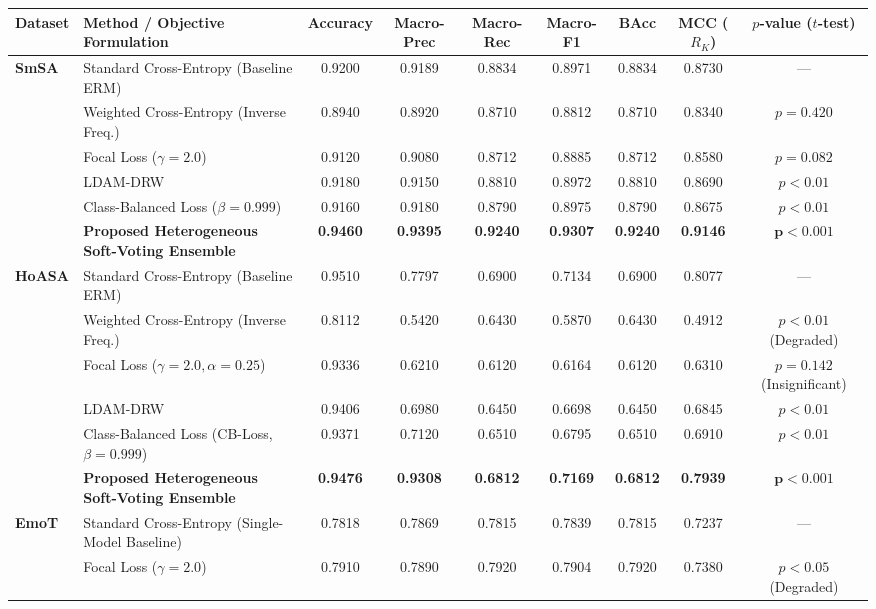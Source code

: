 \begin{tabularx}{\textwidth}{l >{\raggedright\arraybackslash}X c c c c c c c}
\toprule
\textbf{Dataset} & \textbf{Method / Objective Formulation} & \textbf{Accuracy} & \textbf{Macro-Prec} & \textbf{Macro-Rec} & \textbf{Macro-F1} & \textbf{BAcc} & \textbf{MCC ($R_K$)} & \textbf{$p$-value ($t$-test)} \\
\midrule
\multirow{6}{*}{\textbf{SmSA}}
& Standard Cross-Entropy (Baseline ERM) & 0.9200 & 0.9189 & 0.8834 & 0.8971 & 0.8834 & 0.8730 & --- \\
& Weighted Cross-Entropy (Inverse Freq.) & 0.8940 & 0.8920 & 0.8710 & 0.8812 & 0.8710 & 0.8340 & $p = 0.420$ \\
& Focal Loss ($\gamma = 2.0$) & 0.9120 & 0.9080 & 0.8712 & 0.8885 & 0.8712 & 0.8580 & $p = 0.082$ \\
& LDAM-DRW & 0.9180 & 0.9150 & 0.8810 & 0.8972 & 0.8810 & 0.8690 & $p < 0.01$ \\
& Class-Balanced Loss ($\beta = 0.999$) & 0.9160 & 0.9180 & 0.8790 & 0.8975 & 0.8790 & 0.8675 & $p < 0.01$ \\
& \textbf{Proposed Heterogeneous Soft-Voting Ensemble} & \textbf{0.9460} & \textbf{0.9395} & \textbf{0.9240} & \textbf{0.9307} & \textbf{0.9240} & \textbf{0.9146} & $\mathbf{p < 0.001}$ \\
\midrule
\multirow{6}{*}{\textbf{HoASA}}
& Standard Cross-Entropy (Baseline ERM) & 0.9510 & 0.7797 & 0.6900 & 0.7134 & 0.6900 & 0.8077 & --- \\
& Weighted Cross-Entropy (Inverse Freq.) & 0.8112 & 0.5420 & 0.6430 & 0.5870 & 0.6430 & 0.4912 & $p < 0.01$ (Degraded) \\
& Focal Loss ($\gamma = 2.0, \alpha = 0.25$) & 0.9336 & 0.6210 & 0.6120 & 0.6164 & 0.6120 & 0.6310 & $p = 0.142$ (Insignificant) \\
& LDAM-DRW & 0.9406 & 0.6980 & 0.6450 & 0.6698 & 0.6450 & 0.6845 & $p < 0.01$ \\
& Class-Balanced Loss (CB-Loss, $\beta = 0.999$) & 0.9371 & 0.7120 & 0.6510 & 0.6795 & 0.6510 & 0.6910 & $p < 0.01$ \\
& \textbf{Proposed Heterogeneous Soft-Voting Ensemble} & \textbf{0.9476} & \textbf{0.9308} & \textbf{0.6812} & \textbf{0.7169} & \textbf{0.6812} & \textbf{0.7939} & $\mathbf{p < 0.001}$ \\
\midrule
\multirow{4}{*}{\textbf{EmoT}}
& Standard Cross-Entropy (Single-Model Baseline) & 0.7818 & 0.7869 & 0.7815 & 0.7839 & 0.7815 & 0.7237 & --- \\
& Focal Loss ($\gamma = 2.0$) & 0.7910 & 0.7890 & 0.7920 & 0.7904 & 0.7920 & 0.7380 & $p < 0.05$ (Degraded) \\

\end{tabularx}
